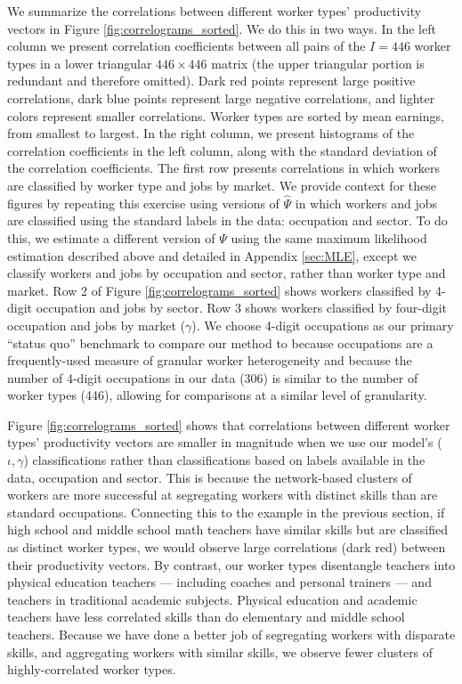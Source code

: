 \documentclass[12pt]{article}
\def\g{\gamma}
\def\i{\iota}
\theoremstyle{definition}
\theoremstyle{plain}
\begin{document}
We summarize the correlations between different worker types' productivity vectors in Figure \ref{fig:correlograms_sorted}. We do this in two ways. In the left column we present correlation coefficients between all pairs of the $I=446$ worker types in a lower triangular $446\times 446$ matrix (the upper triangular portion is redundant and therefore omitted). Dark red points represent large positive correlations, dark blue points represent large negative correlations, and lighter colors represent smaller correlations. Worker types are sorted by mean earnings, from smallest to largest. In the right column, we present histograms of the correlation coefficients in the left column, along with the standard deviation of the correlation coefficients. The first row presents correlations in which workers are classified by worker type and jobs by market. We provide context for these figures by repeating this exercise using versions of $\hat \Psi$ in which workers and jobs are classified using the standard labels in the data: occupation and sector. To do this, we estimate a different version of $\Psi$ using the same maximum likelihood estimation described above and detailed in Appendix \ref{sec:MLE}, except we classify workers and jobs by occupation and sector, rather than worker type and market. Row 2 of Figure \ref{fig:correlograms_sorted} shows workers classified by 4-digit occupation and jobs by sector. Row 3 shows workers classified by four-digit occupation and jobs by market ($\g$). We choose 4-digit occupations as our primary ``status quo'' benchmark to compare our method to because occupations are a frequently-used measure of granular worker heterogeneity and because the number of 4-digit occupations in our data (306) is similar to the number of worker types (446), allowing for comparisons at a similar level of granularity.

Figure \ref{fig:correlograms_sorted} shows that correlations between different worker types' productivity vectors are smaller in magnitude when we use our model's ($\i,\g$) classifications rather than classifications based on labels available in the data, occupation and sector.  This is because the network-based clusters of workers are more successful at segregating workers with distinct skills than are standard occupations. Connecting this to the example in the previous section, if high school and middle school math teachers have similar skills but are classified as distinct worker types, we would observe large correlations (dark red) between their productivity vectors. By contrast, our worker types disentangle teachers into physical education teachers --- including coaches and personal trainers --- and teachers in traditional academic subjects. Physical education and academic teachers have less correlated skills than do elementary and middle school teachers.  Because we have done a better job of segregating workers with disparate skills, and aggregating workers with similar skills, we observe fewer clusters of highly-correlated worker types. 
\end{document}
